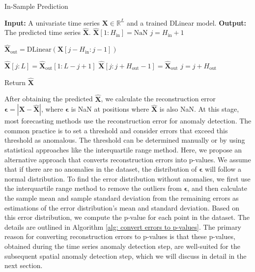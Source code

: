 \documentclass[11pt]{article}
\begin{document}
\begin{algorithm}
\caption{In-Sample Prediction}\label{alg: in-sample prediction}
\begin{algorithmic}[1] %
\State \textbf{Input:} A univariate time series $\bm{X} \in \mathbb{R}^L$ and a trained DLinear model.
\State \textbf{Output:} The predicted time series $\hat{\bm{X}}$.
\State $\hat{\bm{X}}[1:H_{\mathrm{in}}] = \mathrm{NaN}$ %
\State $j = H_{\mathrm{in}} + 1$ %

    \State $\hat{\bm{X}}_{\mathrm{out}} = \mathrm{DLinear}(\bm{X}[j-H_{\mathrm{in}}:j-1])$ %

        \State $\hat{\bm{X}}[j:L] = \hat{\bm{X}}_{\mathrm{out}}[1:L-j+1]$ %
    \Else
        \State $\hat{\bm{X}}[j:j+H_{\mathrm{out}}-1] = \hat{\bm{X}}_{\mathrm{out}}$
    \EndIf
    \State $j = j + H_{\mathrm{out}}$ %
\EndWhile

\State Return $\hat{\bm{X}}$
\end{algorithmic}
\end{algorithm}



After obtaining the predicted $\hat{\bm{X}}$, we calculate the reconstruction error $\bm{\epsilon}=|\bm{X}-\hat{\bm{X}}|$, where $\bm{\epsilon}$ is NaN at positions where $\hat{\bm{X}}$ is also NaN. At this stage, most forecasting methods use the reconstruction error for anomaly detection. The common practice is to set a threshold and consider errors that exceed this threshold as anomalous. The threshold can be determined manually or by using statistical approaches like the interquartile range method. Here, we propose an alternative approach that converts reconstruction errors into p-values. We assume that if there are no anomalies in the dataset, the distribution of $\bm{\epsilon}$ will follow a normal distribution. To find the error distribution without anomalies, we first use the interquartile range method to remove the outliers from $\bm{\epsilon}$, and then calculate the sample mean and sample standard deviation from the remaining errors as estimations of the error distribution's mean and standard deviation. Based on this error distribution, we compute the p-value for each point in the dataset. The details are outlined in Algorithm \ref{alg: convert errors to p-values}. The primary reason for converting reconstruction errors to p-values is that these p-values, obtained during the time series anomaly detection step, are well-suited for the subsequent spatial anomaly detection step, which we will discuss in detail in the next section.
\end{document}
